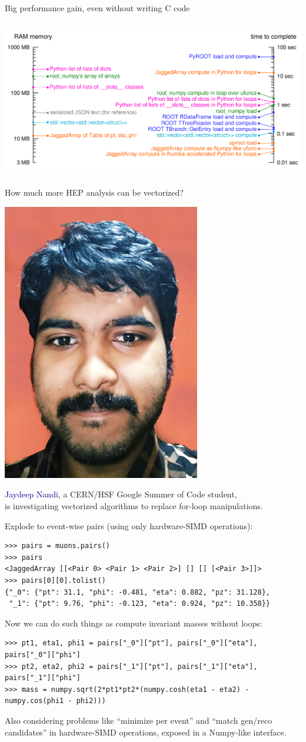 \documentclass[aspectratio=169]{beamer}
\begin{document}
\begin{frame}{Big performance gain, even without writing C code}
\vspace{0.3 cm}
\begin{columns}
\includegraphics[width=\linewidth]{logscales.pdf}
\end{columns}
\end{frame}

\begin{frame}[fragile]{How much more HEP analysis can be vectorized?}
\scriptsize
\vspace{0.5 cm}

\hfill \includegraphics[height=3 cm]{jaydeep.jpg}

\vspace{-3 cm}
{\normalsize \textcolor{darkblue}{Jaydeep Nandi}, a CERN/HSF Google Summer of Code student, \\ is investigating vectorized algorithms to replace for-loop manipulations.}

\vspace{0.4 cm}
{\normalsize Explode to event-wise pairs (using only hardware-SIMD operations):}
\begin{verbatim}
>>> pairs = muons.pairs()
>>> pairs
<JaggedArray [[<Pair 0> <Pair 1> <Pair 2>] [] [] [<Pair 3>]]>
>>> pairs[0][0].tolist()
{"_0": {"pt": 31.1, "phi": -0.481, "eta": 0.882, "pz": 31.128},
 "_1": {"pt": 9.76, "phi": -0.123, "eta": 0.924, "pz": 10.358}}
\end{verbatim}

\vspace{0.4 cm}
{\normalsize Now we can do such things as compute invariant masses without loops:}
\begin{verbatim}
>>> pt1, eta1, phi1 = pairs["_0"]["pt"], pairs["_0"]["eta"], pairs["_0"]["phi"]
>>> pt2, eta2, phi2 = pairs["_1"]["pt"], pairs["_1"]["eta"], pairs["_1"]["phi"]
>>> mass = numpy.sqrt(2*pt1*pt2*(numpy.cosh(eta1 - eta2) - numpy.cos(phi1 - phi2)))
\end{verbatim}

\vspace{0.4 cm}
{\normalsize Also considering problems like ``minimize per event'' and ``match gen/reco candidates'' in hardware-SIMD operations, exposed in a Numpy-like interface.}
\end{frame}
\end{document}
